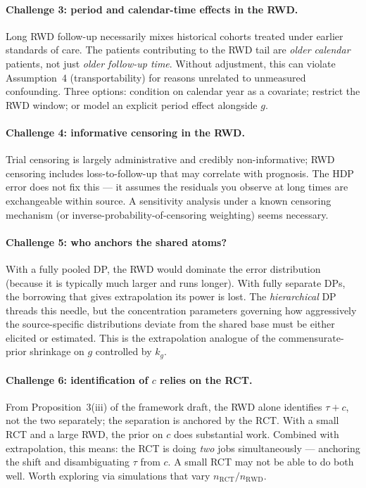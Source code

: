 \documentclass[11pt]{article}
\newcommand{\tauf}{\tau}
\newcommand{\cf}{c}
\newcommand{\gf}{g}
\newcommand{\RCT}{\mathrm{RCT}}
\newcommand{\RWD}{\mathrm{RWD}}
\begin{document}
\paragraph{Challenge 3: period and calendar-time effects in the RWD.}
Long RWD follow-up necessarily mixes historical cohorts treated under earlier
standards of care. The patients contributing to the RWD tail are
\emph{older calendar} patients, not just \emph{older follow-up time}.
Without adjustment, this can violate Assumption~4 (transportability) for
reasons unrelated to unmeasured confounding. Three options:
condition on calendar year as a covariate; restrict the RWD window;
or model an explicit period effect alongside $\gf$.

\paragraph{Challenge 4: informative censoring in the RWD.}
Trial censoring is largely administrative and credibly non-informative;
RWD censoring includes loss-to-follow-up that may correlate with
prognosis. The HDP error does not fix this --- it assumes the residuals you
observe at long times are exchangeable within source. A sensitivity analysis
under a known censoring mechanism (or inverse-probability-of-censoring
weighting) seems necessary.

\paragraph{Challenge 5: who anchors the shared atoms?}
With a fully pooled DP, the RWD would dominate the error distribution
(because it is typically much larger and runs longer). With fully separate
DPs, the borrowing that gives extrapolation its power is lost. The
\emph{hierarchical} DP threads this needle, but the concentration parameters
governing how aggressively the source-specific distributions deviate from
the shared base must be either elicited or estimated. This is the
extrapolation analogue of the commensurate-prior shrinkage on $\gf$
controlled by $k_g$.

\paragraph{Challenge 6: identification of $\cf$ relies on the RCT.}
From Proposition~3(iii) of the framework draft, the RWD alone identifies
$\tauf + \cf$, not the two separately; the separation is anchored by the
RCT. With a small RCT and a large RWD, the prior on $\cf$ does substantial
work. Combined with extrapolation, this means: the RCT is doing
\emph{two} jobs simultaneously --- anchoring the shift and disambiguating
$\tauf$ from $\cf$. A small RCT may not be able to do both well. Worth
exploring via simulations that vary $n_{\RCT}/n_{\RWD}$.
\end{document}
